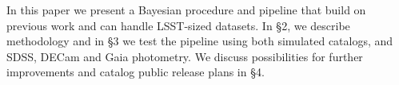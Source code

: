 In this paper we present a Bayesian procedure and pipeline that build on previous work and can handle LSST-sized datasets.
In \S2, we describe methodology and in \S3 we test the pipeline using both simulated catalogs, and SDSS, DECam and Gaia
photometry. We discuss possibilities for further improvements and catalog public release plans in \S4. 
